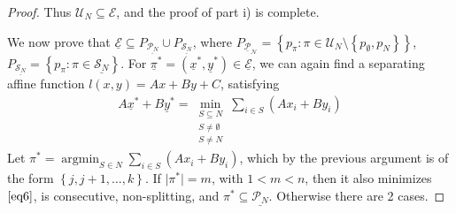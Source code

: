 \documentclass{article}
\theoremstyle{case}
\DeclareMathOperator*{\argmin}{argmin} %
\begin{document}
\begin{proof}
Thus $\mathcal{U}_N \subseteq \mathcal{E}$, and the proof of part i) is complete.

We now prove that $\underline{\mathcal{E}} \subseteq P_{\underline{\mathcal{P}_N}} \cup P_{\underline{\mathcal{S}_N}}$, where $P_{\mathcal{\underline{P}_N}} = \left\lbrace p_{\pi} \colon \pi \in \mathcal{U}_N \setminus \left\lbrace p_{\emptyset}, p_N \right\rbrace \right\rbrace$, $P_{\underline{\mathcal{S}_N}} = \left\lbrace p_{\pi} \colon \pi \in \underline{\mathcal{S}_N} \right\rbrace$. For $\underline{\pi}^* = \left( \underline{x}^*, \underline{y}^* \right) \in \underline{\mathcal{E}}$, we can again find a separating affine function $l\left( x,y\right) = Ax + By + C$, satisfying
\begin{align} \label{eq6}
A\underline{x}^* + B\underline{y}^* =\min_{\substack{S \subseteq N \\ S \neq \emptyset \\ S \neq N}} \sum_{i \in S} \left( Ax_i + By_i\right)
\end{align}
Let $\pi^* = \argmin_{S \in N} \sum_{i \in S} \left( Ax_i + By_i\right)$, which by the previous argument is of the form $\left\lbrace j, j+1, \dots, k\right\rbrace$. If $\vert \pi^* \vert = m$, with $1 < m < n$, then it also minimizes $\ref{eq6}$, is consecutive, non-splitting, and $\pi^* \subseteq \underline{\mathcal{P}_N}$. Otherwise there are 2 cases.


\end{proof}
\end{document}
